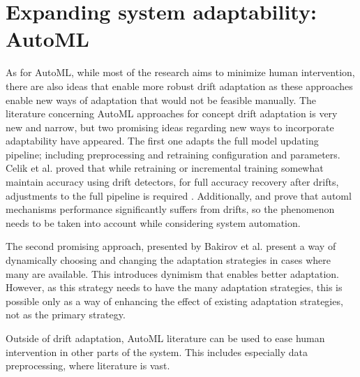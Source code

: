 \section{Expanding system adaptability: AutoML}

As for AutoML, while most of the research aims to minimize human intervention, there are also ideas that enable more robust drift adaptation as these approaches enable new ways of adaptation that would not be feasible manually. The literature concerning AutoML approaches for concept drift adaptation is very new and narrow, but two promising ideas regarding new ways to incorporate adaptability have appeared. The first one adapts the full model updating pipeline; including preprocessing and retraining configuration and parameters. Celik et al. proved that while retraining or incremental training somewhat maintain accuracy using drift detectors, for full accuracy recovery after drifts, adjustments to the full pipeline is required \cite{celik_adaptation_2021}. Additionally, \cite{celik_adaptation_2021} and \cite{madrid_towards_2019} prove that automl mechanisms performance significantly suffers from drifts, so the phenomenon needs to be taken into account while considering system automation. 


The second promising approach, presented by Bakirov et al. \cite{bakirov_automated_2021} present a way of dynamically choosing and changing the adaptation strategies in cases where many are available. This introduces dynimism that enables better adaptation. However, as this strategy needs to have the many adaptation strategies, this is possible only as a way of enhancing the effect of existing adaptation strategies, not as the primary strategy.

Outside of drift adaptation, AutoML literature can be used to ease human intervention in other parts of the system. This includes especially data preprocessing, where literature is vast.



